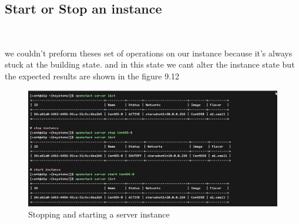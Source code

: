 \begin{spacing}{1.2}
\section{Start or Stop an instance}

\\
\par we couldn't preform theses set of operations on our instance because it's always stuck at the building state. and in this state we cant alter the instance state but the expected results are shown in the figure 9.12
\\
\begin{figure}[!htb] 
\begin{center} 
\includegraphics[width=1\linewidth]{Cloud/Creating and Running Instances/C_3_expected_result_since our server us stuck at building process we can't do theses manipulation .png} 
\end{center} 
\caption{Stopping and starting a server instance} 
\end{figure} 
\FloatBarrier
\\


\end{spacing}

